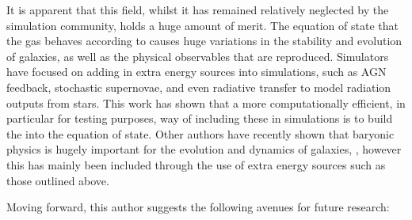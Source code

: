 It is apparent that this field, whilst it has remained relatively neglected by the simulation community, holds a huge amount of merit.
The equation of state that the gas behaves according to causes huge variations in the stability and evolution of galaxies, as well as the physical observables that are reproduced.
Simulators have focused on adding in extra energy sources into simulations, such as AGN feedback, stochastic supernovae, and even radiative transfer to model radiation outputs from stars.
This work has shown that a more computationally efficient, in particular for testing purposes, way of including these in simulations is to build the into the equation of state.
Other authors have recently shown that baryonic physics is hugely important for the evolution and dynamics of galaxies, \citep{schaye_eagle_2015, vogelsberger_introducing_2014}, however this has mainly been included through the use of extra energy sources such as those outlined above.

Moving forward, this author suggests the following avenues for future research:

